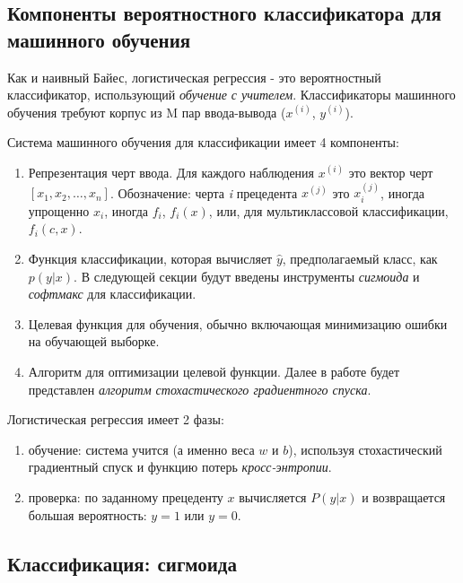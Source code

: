 \documentclass[a4paper,12pt,preview]{report} %
\begin{document}
	
	\subsection{Компоненты вероятностного классификатора для машинного обучения}
	Как и наивный Байес, логистическая регрессия - это вероятностный классификатор, использующий \textit{обучение с учителем}. Классификаторы машинного обучения требуют корпус из M пар ввода-вывода ($x^{(i)}$, $y^{(i)}$).
	
	Система машинного обучения для классификации имеет 4 компоненты:
	\begin{enumerate}
		\item Репрезентация черт ввода. Для каждого наблюдения $x^{(i)}$ это вектор черт $[x_1, x_2, \dots, x_n]$. Обозначение: черта \textit{i} прецедента $x^{(j)}$ это $x_i^{(j)}$, иногда упрощенно $x_i$, иногда $f_i$, $f_i(x)$, или, для мультиклассовой классификации, $f_i(c, x)$.
		
		\item Функция классификации, которая вычисляет $\hat{y}$, предполагаемый класс, как $p(y | x)$. В следующей секции будут введены инструменты \textit{сигмоида} \cite{16} и \textit{софтмакс} для классификации. 
		
		\item Целевая функция для обучения, обычно включающая минимизацию ошибки на обучающей выборке. 
		
		\item Алгоритм для оптимизации целевой функции. Далее в работе будет представлен \textit{алгоритм стохастического градиентного спуска}.		
		
	\end{enumerate}
	
	
	Логистическая регрессия имеет 2 фазы:
	\begin{enumerate}
		\item обучение: система учится (а именно веса $w$ и $b$), используя стохастический градиентный спуск и функцию потерь \textit{кросс-энтропии}.
		
		\item проверка: по заданному прецеденту $x$ вычисляется $P(y | x)$ и возвращается большая вероятность: $y = 1$ или $y = 0$.
		
	\end{enumerate}
	
	
	\subsection{Классификация: сигмоида}
	
\end{document}
